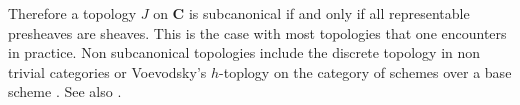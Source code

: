 \documentclass[12pt,reqno,a4paper]{amsart}
\theoremstyle{plain}
\theoremstyle{definition}
\theoremstyle{remark}
\begin{document}
Therefore a topology $J$ on $\mathbf{C}$ is subcanonical if and only if all representable presheaves are sheaves.
This is the case with most topologies that one encounters in practice.
Non subcanonical topologies include the discrete topology in non trivial categories or Voevodsky's $h$-toplogy on the category of schemes over a base scheme \cite[\href{https://stacks.math.columbia.edu/tag/0EV1}{Tag 0EV1}]{stacks-project}.
See also \cite{hj14}.

\printbibliography
\vfill
\end{document}
